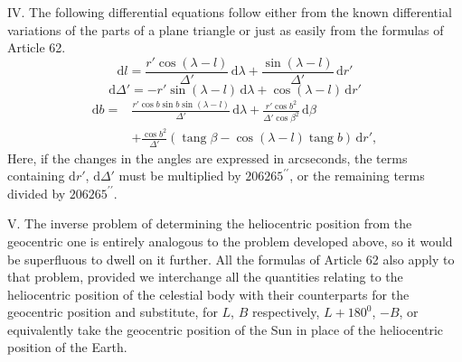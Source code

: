 IV. The following differential equations follow either from the known differential variations of the parts of a plane triangle or just as easily from the formulas of Article 62.
\[
\mathrm{d}l=\frac{r'\cos(\lambda-l)}{\Delta'}\,\mathrm{d}\lambda+\frac{\sin(\lambda-l)}{\Delta'}\,\mathrm{d}r'
\]
\[
\mathrm{d}\Delta'=-r'\sin(\lambda-l)\,\mathrm{d}\lambda+\cos(\lambda-l)\,\mathrm{d}r'
\]
\[
\begin{aligned}
\mathrm{d}b={}&\frac{r'\cos b\sin b\sin(\lambda-l)}{\Delta'}\,\mathrm{d}\lambda
+\frac{r'\cos b^2}{\Delta'\cos\beta^2}\,\mathrm{d}\beta\\
&+\frac{\cos b^2}{\Delta'}(\operatorname{tang}\beta-\cos(\lambda-l)\operatorname{tang}b)\,\mathrm{d}r',
\end{aligned}
\]
\noindent Here, if the changes in the angles are expressed in arcseconds, the terms containing $\mathrm{d}r'$, $\mathrm{d}\Delta'$ must be multiplied by $206265^{\prime\prime}$, or the remaining terms divided by $206265^{\prime\prime}$.

V. The inverse problem of determining the heliocentric position from the geocentric one is entirely analogous to the problem developed above, so it would be superfluous to dwell on it further. All the formulas of Article 62 also apply to that problem, provided we interchange all the quantities relating to the heliocentric position of the celestial body with their counterparts for the geocentric position and substitute, for $L$, $B$ respectively, $L+180^0$, $-B$, or equivalently take the geocentric position of the Sun in place of the heliocentric position of the Earth.
